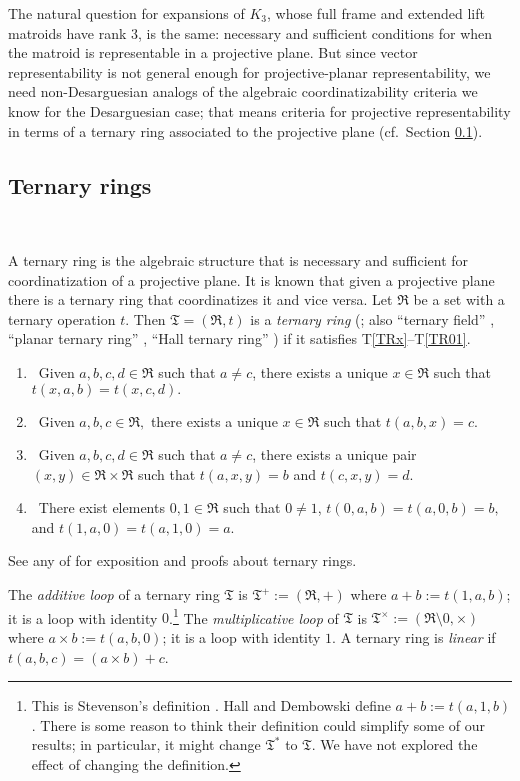 \documentclass[reqno,12pt]{amsart}
\theoremstyle{remark}
\numberwithin{equation}{section}
\numberwithin{figure}{section}
\newcommand \fR{\mathfrak R}
\newcommand \fT{\mathfrak T}
\begin{document}
The natural question for expansions of $K_3$, whose full frame and extended lift matroids have rank 3, is the same: necessary and sufficient conditions for when the matroid is representable in a projective plane.  But since vector representability is not general enough for projective-planar representability, we need non-Desarguesian analogs of the algebraic coordinatizability criteria we know for the Desarguesian case; that means criteria for projective representability in terms of a ternary ring associated to the projective plane (cf.\ Section \ref{ternary}).


\subsection{Ternary rings}\label{ternary}\

A ternary ring is the algebraic structure that is necessary and sufficient for coordinatization of a projective plane.  It is known that given a projective plane there is a ternary ring that coordinatizes it and vice versa.  Let $\fR$ be a set with a ternary operation $t$.  
Then $\fT = (\fR,t)$ is a \emph{ternary ring} (\cite{st}; also ``ternary field'' \cite{Demb, Hall}, ``planar ternary ring'' \cite{HP}, ``Hall ternary ring'' \cite{Martin}) if it satisfies T\ref{TRx}--T\ref{TR01}.  
%
\begin{enumerate}[\ T1.]
\item \  Given $a,b,c,d \in \fR$ such that $a \neq c$, there exists a unique $x \in \fR$ such that $t(x,a,b)=t(x,c,d).$
\label{TRx}
\item \  Given $a,b,c \in \fR,$ there exists a unique $x \in \fR$ such that $t(a,b,x) = c.$
\label{TRb}
\item \  Given $a,b,c,d \in \fR$ such that $a \neq c$, there exists a unique pair $(x,y) \in \fR \times \fR$ such that $t(a,x,y) = b$ and $t(c,x,y)=d.$
\label{TRmb}
\item \  There exist elements $0,1 \in \fR$ such that $ 0 \neq 1$, $t(0,a,b)=t(a,0,b)=b,$ and $t(1,a,0)=t(a,1,0)=a.$
\label{TR01}
\end{enumerate}
%
See any of \cite{Demb, Hall, HP, st} for exposition and proofs about ternary rings.

The \emph{additive loop} of a ternary ring $\fT$ is $\fT^+ := (\fR,+)$ where $a+b:= t(1,a,b)$; it is a loop with identity $0$.\footnote{This is Stevenson's definition \cite{st}.  Hall \cite{Hall} and Dembowski \cite{Demb} define $a+b:=t(a,1,b)$.  There is some reason to think their definition could simplify some of our results; in particular, it might change $\fT^*$ to $\fT$.  We have not explored the effect of changing the definition.}  
The \emph{multiplicative loop} of $\fT$ is $\fT^\times := (\fR \setminus {0},\times)$ where $a \times b:= t(a,b,0)$; it is a loop with identity $1$. 
A ternary ring is \emph{linear} if $t(a,b,c) = (a \times b)+c$.
\end{document}
